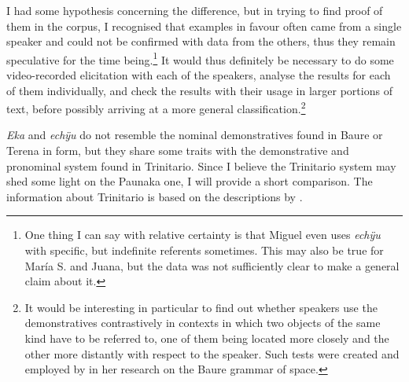 I had some hypothesis concerning the difference, but in trying to find proof of them in the corpus, I recognised that examples in favour often came from a single speaker and could not be confirmed with data from the others, thus they remain speculative for the time being.\footnote{\label{fn:useDEMb}One thing I can say with relative certainty is that Miguel even uses \textit{echÿu} with specific, but indefinite referents sometimes. This may also be true for María S. and Juana, but the data was not sufficiently clear to make a general claim about it.} It would thus definitely be necessary to do some video-recorded elicitation with each of the speakers, analyse the results for each of them individually, and check the results with their usage in larger portions of text, before possibly arriving at a more general classification.\footnote{It would be interesting in particular to find out whether speakers use the demonstratives contrastively in contexts in which two objects of the same kind have to be referred to, one of them being located more closely and the other more distantly with respect to the speaker. Such tests were created and employed by \citet[]{Admiraal2016} in her research on the Baure grammar of space.}

\textit{Eka} and \textit{echÿu} do not resemble the nominal demonstratives found in Baure or Terena in form, but they share some traits with the demonstrative and pronominal system found in Trinitario. Since I believe the Trinitario system may shed some light on the Paunaka one, I will provide a short comparison. The information about Trinitario is based on the descriptions by \citet[]{Rose2015a,Rose2017}. 


